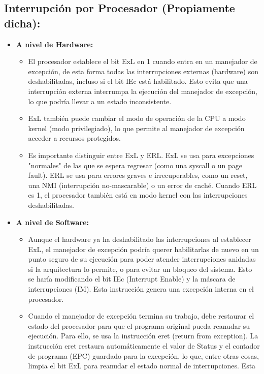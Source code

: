 \documentclass{article}
\begin{document}
{{\subsection{Interrupción por Procesador (Propiamente dicha):}
\begin{itemize}
    \item \textbf{A nivel de Hardware:}
    \begin{itemize}
        \item El procesador establece el bit  ExL en 1 cuando entra en un manejador de excepción, de esta forma todas las interrupciones externas (hardware) son deshabilitadas, incluso si el bit IEc está habilitado. Esto evita que una interrupción externa interrumpa la ejecución del manejador de excepción, lo que podría llevar a un estado inconsistente.
        \item ExL también puede cambiar el modo de operación de la CPU a modo kernel (modo privilegiado), lo que permite al manejador de excepción acceder a recursos protegidos.
        \item Es importante distinguir entre ExL y ERL. ExL se usa para excepciones "normales" de las que se espera regresar (como una syscall o un page fault). ERL se usa para errores graves e irrecuperables, como un reset, una NMI (interrupción no-mascarable) o un error de caché. Cuando ERL es 1, el procesador también está en modo kernel con las interrupciones deshabilitadas.
    \end{itemize}
    \item \textbf{A nivel de Software:}
    \begin{itemize}
        \item Aunque el hardware ya ha deshabilitado las interrupciones al establecer ExL, el manejador de excepción podría querer habilitarlas de nuevo en un punto seguro de su ejecución para poder atender interrupciones anidadas si la arquitectura lo permite, o para evitar un bloqueo del sistema. Esto se haría modificando el bit IEc (Interrupt Enable) y la máscara de interrupciones (IM). Esta instrucción genera una excepción interna en el procesador.
        \item Cuando el manejador de excepción termina su trabajo, debe restaurar el estado del procesador para que el programa original pueda reanudar su ejecución. Para ello, se usa la instrucción eret (return from exception). La instrucción eret restaura automáticamente el valor de Status y el contador de programa (EPC) guardado para la excepción, lo que, entre otras cosas, limpia el bit ExL para reanudar el estado normal de interrupciones. Esta
    \end{itemize}
\end{itemize}


}}
\end{document}
